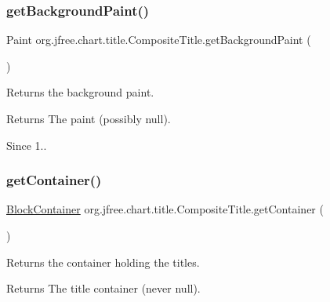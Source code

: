 \subsubsection{\texorpdfstring{get\+Background\+Paint()}{getBackgroundPaint()}}
{\footnotesize\ttfamily Paint org.\+jfree.\+chart.\+title.\+Composite\+Title.\+get\+Background\+Paint (\begin{DoxyParamCaption}{ }\end{DoxyParamCaption})}

Returns the background paint.

\begin{DoxyReturn}{Returns}
The paint (possibly {\ttfamily null}).
\end{DoxyReturn}
\begin{DoxySince}{Since}
1.. 
\end{DoxySince}
\mbox{\label{classorg_1_1jfree_1_1chart_1_1title_1_1_composite_title_a7cd67d3f5cd85f6cc17ad311c58897fe}} 
\subsubsection{\texorpdfstring{get\+Container()}{getContainer()}}
{\footnotesize\ttfamily \mbox{\hyperlink{classorg_1_1jfree_1_1chart_1_1block_1_1_block_container}{Block\+Container}} org.\+jfree.\+chart.\+title.\+Composite\+Title.\+get\+Container (\begin{DoxyParamCaption}{ }\end{DoxyParamCaption})}

Returns the container holding the titles.

\begin{DoxyReturn}{Returns}
The title container (never {\ttfamily null}). 
\end{DoxyReturn}
\mbox{\label{classorg_1_1jfree_1_1chart_1_1title_1_1_composite_title_a64773459321bd611e3f2588a045f97cb}} 

